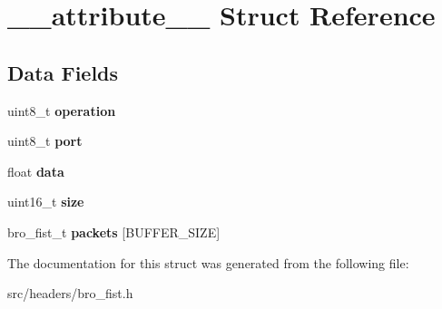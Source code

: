 \hypertarget{struct____attribute____}{
\section{\_\-\_\-attribute\_\-\_\- Struct Reference}
\label{struct____attribute____}
}
\subsection*{Data Fields}
\begin{DoxyCompactItemize}
\item 
\hypertarget{struct____attribute_____a97d486d6926f9137837e1d8ecf0bbfdd}{
uint8\_\-t {\bfseries operation}}
\label{struct____attribute_____a97d486d6926f9137837e1d8ecf0bbfdd}

\item 
\hypertarget{struct____attribute_____a2fa54f9024782843172506fadbee2ac8}{
uint8\_\-t {\bfseries port}}
\label{struct____attribute_____a2fa54f9024782843172506fadbee2ac8}

\item 
\hypertarget{struct____attribute_____a173b91873a3fc4f50a95416a6204d963}{
float {\bfseries data}}
\label{struct____attribute_____a173b91873a3fc4f50a95416a6204d963}

\item 
\hypertarget{struct____attribute_____aaba88b24a21a6c70c895c0d55f4a69a0}{
uint16\_\-t {\bfseries size}}
\label{struct____attribute_____aaba88b24a21a6c70c895c0d55f4a69a0}

\item 
\hypertarget{struct____attribute_____a5cccc799a79e4430d894573577992c2d}{
bro\_\-fist\_\-t {\bfseries packets} \mbox{[}BUFFER\_\-SIZE\mbox{]}}
\label{struct____attribute_____a5cccc799a79e4430d894573577992c2d}

\end{DoxyCompactItemize}


The documentation for this struct was generated from the following file:\begin{DoxyCompactItemize}
\item 
src/headers/bro\_\-fist.h\end{DoxyCompactItemize}
